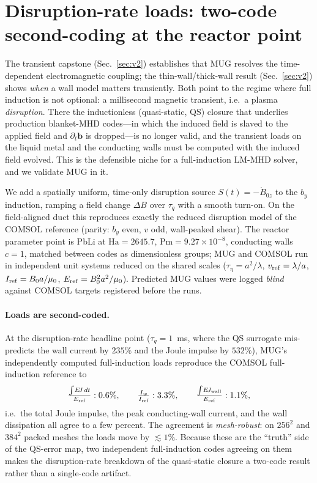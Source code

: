 \documentclass[11pt,letterpaper]{article}
\newcommand{\Ha}{\mathrm{Ha}}
\newcommand{\Pm}{\mathrm{Pm}}
\newcommand{\by}{b_y}
\newcommand{\tq}{\tau_q}
\newcommand{\dB}{\Delta B}
\begin{document}
\section{Disruption-rate loads: two-code second-coding at the reactor point}
\label{sec:disruption}
The transient capstone (Sec.~\ref{sec:v2}) establishes that MUG resolves the
time-dependent electromagnetic coupling; the thin-wall/thick-wall result
(Sec.~\ref{sec:v2}) shows \emph{when} a wall model matters transiently. Both point
to the regime where full induction is not optional: a millisecond magnetic
transient, i.e.\ a plasma \emph{disruption}. There the inductionless
(quasi-static, QS) closure that underlies production blanket-MHD codes---in which
the induced field is slaved to the applied field and $\partial_t\mathbf{b}$ is
dropped---is no longer valid, and the transient loads on the liquid metal and the
conducting walls must be computed with the induced field evolved. This is the
defensible niche for a full-induction LM-MHD solver, and we validate MUG in it.

We add a spatially uniform, time-only disruption source $S(t)=-\dot B_{0z}$ to the
$\by$ induction, ramping a field change $\dB$ over $\tq$ with a smooth turn-on. On
the field-aligned duct this reproduces exactly the reduced disruption model of the
COMSOL reference (parity: $\by$ even, $v$ odd, wall-peaked shear). The reactor
parameter point is PbLi at $\Ha=2645.7$, $\Pm=9.27\times10^{-8}$, conducting walls
$c=1$, matched between codes as dimensionless groups; MUG and COMSOL run in
independent unit systems reduced on the shared scales
($\tau_\eta=a^2/\lambda$, $v_{\rm ref}=\lambda/a$, $I_{\rm ref}=B_0a/\mu_0$,
$E_{\rm ref}=B_0^2a^2/\mu_0$). Predicted MUG values were logged \emph{blind} against
COMSOL targets registered before the runs.

\paragraph{Loads are second-coded.} At the disruption-rate headline point
($\tq=1$~ms, where the QS surrogate mis-predicts the wall current by $235\%$ and the
Joule impulse by $532\%$), MUG's independently computed full-induction loads
reproduce the COMSOL full-induction reference to
\[
  \tfrac{\int\!E\!J\,dt}{E_{\rm ref}}:0.6\%,\qquad
  \tfrac{I_w}{I_{\rm ref}}:3.3\%,\qquad
  \tfrac{\int\!E\!J_{\rm wall}}{E_{\rm ref}}:1.1\%,
\]
i.e.\ the total Joule impulse, the peak conducting-wall current, and the wall
dissipation all agree to a few percent. The agreement is \emph{mesh-robust}: on
$256^2$ and $384^2$ packed meshes the loads move by $\lesssim1\%$. Because these
are the ``truth'' side of the QS-error map, two independent full-induction codes
agreeing on them makes the disruption-rate breakdown of the quasi-static closure a
two-code result rather than a single-code artifact.
\end{document}
